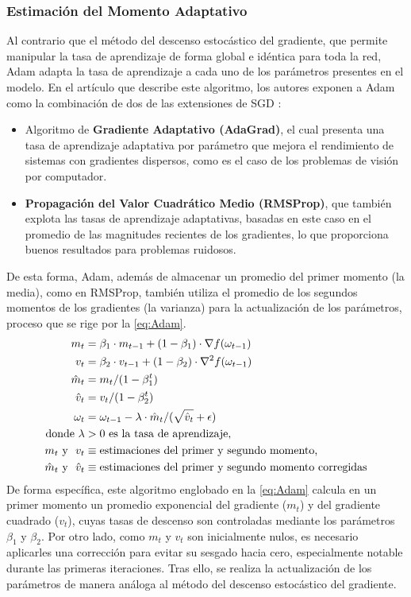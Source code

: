 \subsubsection{Estimación del Momento Adaptativo}

Al contrario que el método del descenso estocástico del gradiente, que permite manipular la tasa de aprendizaje de forma global e idéntica para toda la red, Adam adapta la tasa de aprendizaje a cada uno de los parámetros presentes en el modelo. En el artículo que describe este algoritmo, los autores exponen a Adam como la combinación de dos de las extensiones de SGD \cite{Adam}:
\begin{itemize}
  \item Algoritmo de \textbf{Gradiente Adaptativo (AdaGrad)}, el cual presenta una tasa de aprendizaje adaptativa por parámetro que mejora el rendimiento de sistemas con gradientes dispersos, como es el caso de los problemas de visión por computador. 
  \item \textbf{Propagación del Valor Cuadrático Medio (RMSProp)}, que también explota las tasas de aprendizaje adaptativas, basadas en este caso en el promedio de las magnitudes recientes de los gradientes, lo que proporciona buenos resultados para problemas ruidosos. 
\end{itemize}

De esta forma, Adam, además de almacenar un promedio del primer momento (la media), como en RMSProp, también utiliza el promedio de los segundos momentos de los gradientes (la varianza) para la actualización de los parámetros, proceso que se rige por la \autoref{eq:Adam}.
\begin{align}
    m_t &= \beta_1 \cdot m_{t-1} + (1 - \beta_1) \cdot \nabla f(\omega_{t-1}) \\
    v_t &= \beta_2 \cdot v_{t-1} + (1 - \beta_2) \cdot \nabla^2 f(\omega_{t-1}) \\
    \hat{m}_t &= m_t / (1 - \beta_1^t) \\
    \hat{v}_t &= v_t / (1 - \beta_2^t) \\
    \omega_t &= \omega_{t-1} - \lambda \cdot \hat{m}_t / (\sqrt{\hat{v}_t} + \epsilon) \label{eq:Adam} \\
    \text{donde}~
    \lambda &> 0 \text{\space es la tasa de aprendizaje,} \notag \\
    m_t \text{\space y \space} v_t &\equiv \text{estimaciones del primer y segundo momento,} \notag \\
    \hat{m}_t \text{\space y \space} \hat{v}_t &\equiv \text{estimaciones del primer y segundo momento corregidas} \notag
\end{align}
De forma específica, este algoritmo englobado en la \autoref{eq:Adam} calcula en un primer momento un promedio exponencial del gradiente ($m_t$) y del gradiente cuadrado ($v_t$), cuyas tasas de descenso son controladas mediante los parámetros $\beta_1$ y $\beta_2$. Por otro lado, como $m_t$ y $v_t$ son inicialmente nulos, es necesario aplicarles una corrección para evitar su sesgado hacia cero, especialmente notable durante las primeras iteraciones. Tras ello, se realiza la actualización de los parámetros de manera análoga al método del descenso estocástico del gradiente.

